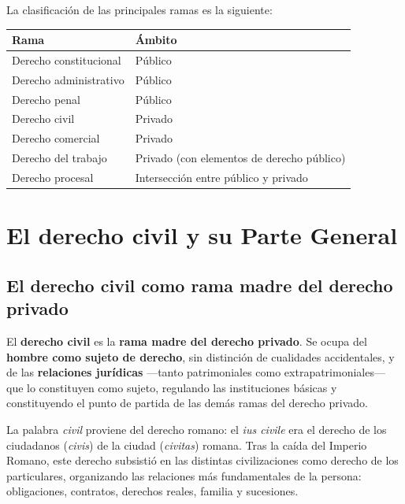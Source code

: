\documentclass[12pt, a4paper]{report}
\begin{document}
La clasificación de las principales ramas es la siguiente:

\vspace{4pt}
\begin{center}
\begin{tabular}{L{5.5cm} L{7.5cm}}
\toprule
\textbf{Rama} & \textbf{Ámbito} \\
\midrule
Derecho constitucional & Público \\
Derecho administrativo & Público \\
Derecho penal & Público \\
\addlinespace
Derecho civil & Privado \\
Derecho comercial & Privado \\
Derecho del trabajo & Privado (con elementos de derecho público) \\
\addlinespace
Derecho procesal & Intersección entre público y privado \\
\bottomrule
\end{tabular}
\end{center}
\vspace{4pt}

\chapter{El derecho civil y su Parte General}

\section{El derecho civil como rama madre del derecho privado}

\begin{definition}
El \textbf{derecho civil} es la \textbf{rama madre del derecho privado}. Se
ocupa del \textbf{hombre como sujeto de derecho}, sin distinción de cualidades
accidentales, y de las \textbf{relaciones jurídicas} ---tanto patrimoniales como
extrapatrimoniales--- que lo constituyen como sujeto, regulando las instituciones
básicas y constituyendo el punto de partida de las demás ramas del derecho
privado.
\end{definition}

La palabra \textit{civil} proviene del derecho romano: el \textit{ius civile}
era el derecho de los ciudadanos (\textit{civis}) de la ciudad
(\textit{civitas}) romana. Tras la caída del Imperio Romano, este derecho
subsistió en las distintas civilizaciones como derecho de los particulares,
organizando las relaciones más fundamentales de la persona: obligaciones,
contratos, derechos reales, familia y sucesiones.
\end{document}
